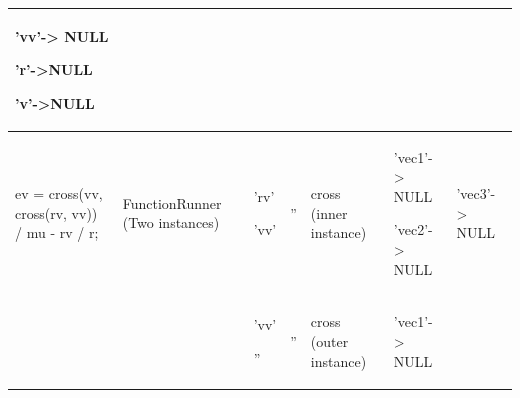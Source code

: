 \begin{center}
\begin{supertabular}{|p{0.9in}|p{0.5in}|p{0.62in}|p{0.73in}|p{0.65in}|p{0.8in}|p{0.8in}|}
\begin{small}
'vv'-> NULL

'r'->NULL

'v'->NULL
\end{small}\\
\hline
\begin{small} %
ev = cross(vv, cross(rv, vv)) / mu - rv / r;
\end{small} &
\begin{small} %
Function\-Runner (Two instances)
\end{small} &
\begin{small} %
'rv'

'vv'
\end{small} &
\begin{small} %
''
\end{small} &
\begin{small} %
cross (inner instance)
\end{small} &
\begin{small} %
'vec1'-> NULL

'vec2'-> NULL
\end{small} &
\begin{small} %
'vec3'-> NULL
\end{small}\\
 & &
\begin{small} %
'vv'

''
\end{small} &
\begin{small} %
''
\end{small} &
\begin{small} %
cross (outer instance)
\end{small} &
\begin{small} %
'vec1'-> NULL


\end{small}
\end{supertabular}
\end{center}
